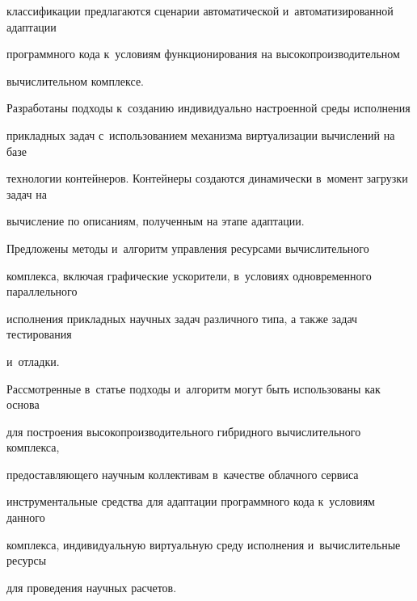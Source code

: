 классификации предлагаются сценарии автоматической и~автоматизированной адаптации 

программного кода к~условиям функционирования на высокопроизводительном 

вычислительном комплексе.

      

      Разработаны подходы к~созданию индивидуально настроенной среды исполнения 

прикладных задач с~использованием механизма виртуализации вычислений на базе 

технологии контейнеров. Контейнеры создаются динамически в~момент загрузки задач на 

вычисление по описаниям, полученным на этапе адаптации.

%      

      Предложены методы и~алгоритм управления ресурсами вычислительного 

комплекса, включая графические ускорители, в~условиях одновременного параллельного 

исполнения прикладных научных задач различного типа, а также задач тестирования 

и~отладки.

     

      Рассмотренные в~статье подходы и~алгоритм могут быть использованы как основа 

для построения высокопроизводительного гибридного вычислительного комплекса, 

предоставляющего научным коллективам в~качестве облачного сервиса 

инструментальные средства для адаптации программного кода к~условиям данного 

комплекса, индивидуальную виртуальную среду исполнения и~вычислительные ресурсы 

для проведения научных расчетов.

      

